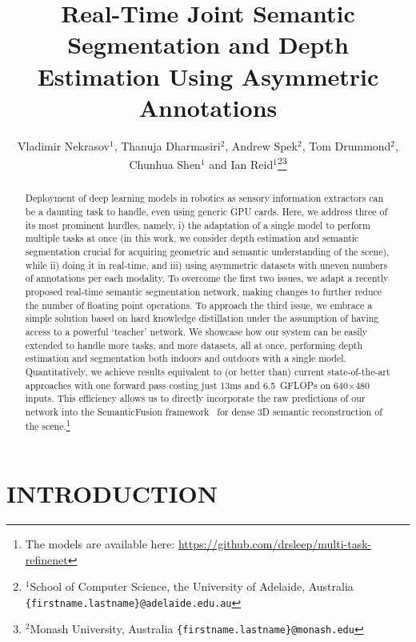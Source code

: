 \documentclass[letterpaper, 10 pt, conference]{ieeeconf}
\title{\LARGE \bf
Real-Time Joint Semantic Segmentation and Depth Estimation Using Asymmetric Annotations
}
\author{Vladimir Nekrasov$^{1}$, Thanuja Dharmasiri$^{2}$, Andrew Spek$^{2}$, Tom Drummond$^{2}$, Chunhua Shen$^{1}$ and Ian Reid$^{1}$\thanks{$^{1}$School of Computer Science, the University of Adelaide, Australia
        {\tt\small \{firstname.lastname\}@adelaide.edu.au}}\thanks{$^{2}$Monash University, Australia \newline
        {\tt\small \{firstname.lastname\}@monash.edu}}}
\begin{document}
\def\etal{\emph{et al.}}


\maketitle
\thispagestyle{empty}
\pagestyle{empty}


\begin{abstract}
	Deployment of deep learning models in robotics as sensory information extractors can be a daunting task to handle, even using generic GPU cards. Here, we address three of its most prominent hurdles, namely, i) the adaptation of a single model to perform multiple tasks at once (in this work, we consider depth estimation and semantic segmentation crucial for acquiring geometric and semantic understanding of the scene), while ii) doing it in real-time, and iii) using asymmetric datasets with uneven numbers of annotations per each modality. To overcome the first two issues, we adapt a recently proposed real-time semantic segmentation network, making changes to further reduce the number of floating point operations. To approach the third issue, we embrace a simple solution based on hard knowledge distillation under the assumption of having access to a powerful `teacher' network. We showcase how our system can be easily extended to handle more tasks, and more datasets, all at once, performing depth estimation and segmentation both indoors and outdoors with a single model. Quantitatively, we achieve results equivalent to (or better than) current state-of-the-art approaches with one forward pass costing just 13ms and 6.5~GFLOPs on 640$\times$480 inputs. This efficiency allows us to directly incorporate the raw predictions of our network into the SemanticFusion framework~\cite{McCormacHDL17} for dense 3D semantic reconstruction of the scene.\footnote[3]{The models are available here: {\url{https://github.com/drsleep/multi-task-refinenet}}}
\end{abstract}


\section{INTRODUCTION}
\end{document}
